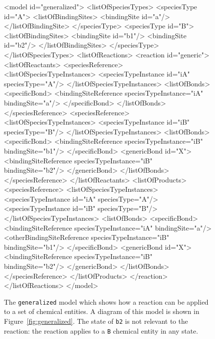 \documentclass{cekarticle}
\begin{document}
\begin{figure}[h]
\begin{example}
<model id="generalized">
    <listOfSpeciesTypes>
        <speciesType id="A">
            <listOfBindingSites>
                <bindingSite id="a"/>
            </listOfBindingSite>
        </speciesType>
        <speciesType id="B">
            <listOfBindingSites>
                <bindingSite id="b1"/>
                <bindingSite id="b2"/>
            </listOfBindingSites>
        </speciesType>
    </listOfSpeciesTypes>
    <listOfReactions>
        <reaction id="generic">
            <listOfReactants>
                <speciesReference>
                    <listOfSpeciesTypeInstances>
                        <speciesTypeInstance id="iA" speciesType="A"/>
                    </listOfSpeciesTypeInstances>
                    <listOfBonds>
                        <specificBond>
                            <bindingSiteReference speciesTypeInstance="iA" bindingSite="a"/>
                        </specificBond>
                    </listOfBonds>
                </speciesReference>
                <speciesReference>
                    <listOfSpeciesTypeInstances>
                        <speciesTypeInstance id="iB" speciesType="B"/>
                    </listOfSpeciesTypeInstances>
                    <listOfBonds>
                        <specificBond>
                            <bindingSiteReference speciesTypeInstance="iB" bindingSite="b1"/>
                        </specificBond>
                        <genericBond id="X">
                            <bindingSiteReference speciesTypeInstance="iB" bindingSite="b2"/>
                        </genericBond>
                    </listOfBonds>
                </speciesReference>
            </listOfReactants>
            <listOfProducts>
                <speciesReference>
                    <listOfSpeciesTypeInstances>
                        <speciesTypeInstance id="iA" speciesType="A"/>
                        <speciesTypeInstance id="iB" speciesType="B"/>
                    </listOfSpeciesTypeInstances>
                    <listOfBonds>
                        <specificBond>
                            <bindingSiteReference speciesTypeInstance="iA" bindingSite="a"/>
                            <otherBindingSiteReference
                                speciesTypeInstance="iB" bindingSite="b1"/>
                        </specificBond>
                        <genericBond id="X">
                            <bindingSiteReference speciesTypeInstance="iB" bindingSite="b2"/>
                        </genericBond>
                    </listOfBonds>
                </speciesReference>
            </listOfProducts>
        </reaction>
    </listOfReactions>
</model>
\end{example}
  \caption{The \texttt{generalized} model which shows how a reaction can be applied to a set
  of chemical entities. A diagram of this model is shown in Figure~\ref{fig:generalized}.  The state of
   \texttt{b2} is not relevant to the reaction:
  the reaction applies to a \texttt{B} chemical entity in any
  state.}
  \label{fig:generalized-xml}
\end{figure}
\end{document}
